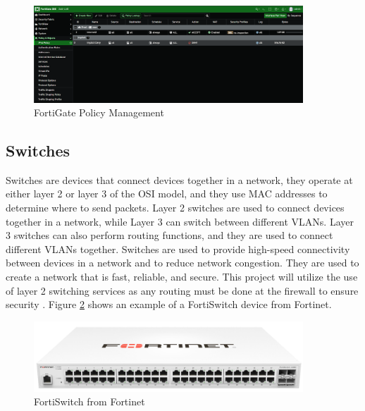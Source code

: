 \documentclass[12pt]{report}
\begin{document}
\begin{figure}[h]
    \centering
    \includegraphics[width=0.9\textwidth]{images/Policy.png}
    \caption{FortiGate Policy Management}
    \label{fig:FortiGatePolicy}
\end{figure}

\subsection{Switches}
Switches are devices that connect devices together in a network, they operate at either layer 2 or layer 3 of the OSI model, and they use MAC addresses to determine where to send packets. Layer 2 switches are used to connect devices together in a network, while Layer 3 can switch between different VLANs. Layer 3 switches can also perform routing functions, and they are used to connect different VLANs together. Switches are used to provide high-speed connectivity between devices in a network and to reduce network congestion. They are used to create a network that is fast, reliable, and secure. This project will utilize the use of layer 2 switching services as any routing must be done at the firewall to ensure security \cite{switch}. Figure \ref{fig:FortiSwitch} shows an example of a FortiSwitch device from Fortinet.
\begin{figure}[h]
    \centering
    \includegraphics[width=0.9\textwidth]{images/FortiSwitch.png}
    \caption{FortiSwitch from Fortinet \cite{FSIMG}}
    \label{fig:FortiSwitch}
\end{figure} 
\end{document}
